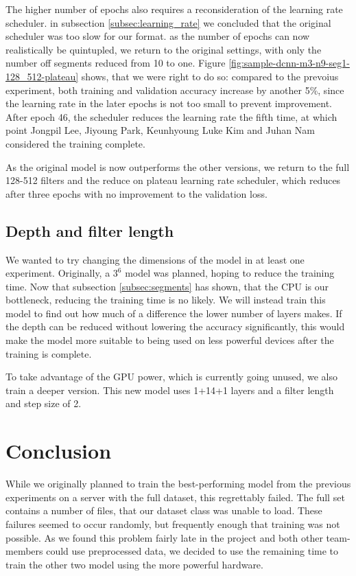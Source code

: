 The higher number of epochs also requires a reconsideration of the learning rate scheduler. in subsection \ref{subsec:learning_rate} we concluded that the original scheduler was too slow for our format. as the number of epochs can now realistically be quintupled, we return to the original settings, with only the number off segments reduced from 10 to one. Figure \ref{fig:sample-dcnn-m3-n9-seg1-128_512-plateau} shows, that we were right to do so: compared to the prevoius experiment, both training and validation accuracy increase by another 5\%, since the learning rate in the later epochs is not too small to prevent improvement. After epoch 46, the scheduler reduces the learning rate the fifth time, at which point Jongpil Lee, Jiyoung Park, Keunhyoung Luke Kim and Juhan Nam considered the training complete.

As the original model is now outperforms the other versions, we return to the full 128-512 filters and the reduce on plateau learning rate scheduler, which reduces after three epochs with no improvement to the validation loss.

\subsection{Depth and filter length}

We wanted to try changing the dimensions of the model in at least one experiment. Originally, a $3^6$ model was planned, hoping to reduce the training time. Now that subsection \ref{subsec:segments} has shown, that the CPU is our bottleneck, reducing the training time is no likely. We will instead train this model to find out how much of a difference the lower number of layers makes. If the depth can be reduced without lowering the accuracy significantly, this would make the model more suitable to being used on less powerful devices after the training is complete. 

To take advantage of the GPU power, which is currently going unused, we also train a deeper version. This new model uses 1+14+1 layers and a filter length and step size of 2.

\section{Conclusion}
\label{sec:conclusion}

While we originally planned to train the best-performing model from the previous experiments on a server with the full dataset, this regrettably failed. The full set contains a number of files, that our dataset class was unable to load. These failures seemed to occur randomly, but frequently enough that training was not possible. As we found this problem fairly late in the project and both other team-members could use preprocessed data, we decided to use the remaining time to train the other two model using the more powerful hardware.

